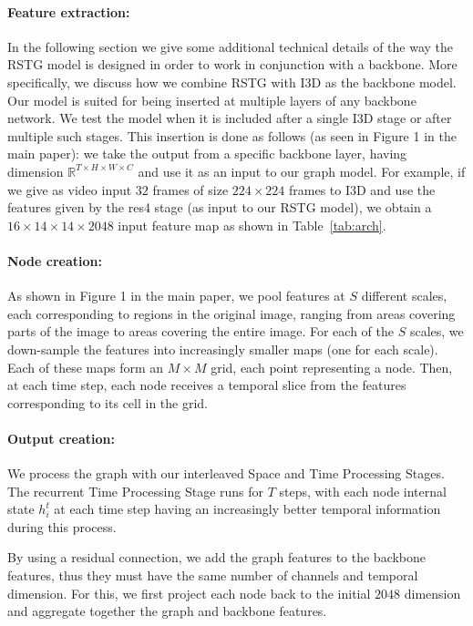 \documentclass{article}
\begin{document}
\paragraph{Feature extraction:} In the following section we give some additional technical details of the way the RSTG model is designed in order to work in conjunction with a backbone. More specifically, we discuss how we combine RSTG with I3D as the backbone model. Our model is suited for being inserted at multiple layers of any backbone network. We test the model when it is included after a single I3D stage or after multiple such stages. This insertion is done as follows (as seen in Figure 1 in the main paper): we take the output from a specific backbone layer, having dimension $\mathbb{R}^{T\times H \times W \times C}$ and use it as an input to our graph model. 
For example, if we give as video input $32$ frames of size $224 \times 224$ frames to I3D and use the features given by the res4 stage (as input to our RSTG model), we obtain a $16 \times 14 \times 14 \times 2048$ input feature map as shown in Table~\ref{tab:arch}.

\paragraph{Node creation:} As shown in Figure 1 in the main paper, we pool features at $S$ different scales, each corresponding to regions in the original image, ranging from areas covering parts of the image to areas covering the entire image. For each of the $S$ scales, we down-sample the features into increasingly smaller maps (one for each scale). Each of these maps form an $M \times M$ grid, each point representing a node. 
Then, at each time step, each node receives a temporal slice from the features corresponding to its cell in the grid. 



\paragraph {Output creation: } We process the graph with our interleaved Space and Time Processing Stages. The recurrent Time Processing Stage runs for $T$ steps, with each node internal state $h_i^t$ at each time step having an increasingly better temporal information during this process. 




By using a residual connection, we add the graph features to the backbone features, thus they must have the same number of channels and temporal dimension. For this, we first project each node back to the initial $2048$ dimension and aggregate together the graph and backbone features.
\end{document}

